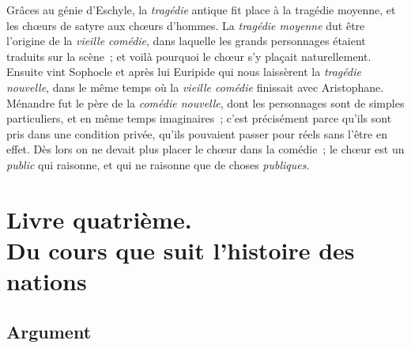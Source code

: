 \documentclass[french,twoside]{book} %
\newcommand\chapteropen{} %
\newcommand\chaptercont{} %
\newcommand\chapterclose{} %
\begin{document}
Grâces au génie d’Eschyle, la {\itshape tragédie} antique fit place à la tragédie moyenne, et les chœurs de satyre aux chœurs d’hommes. La {\itshape tragédie moyenne} dut être l’origine de la {\itshape vieille comédie}, dans laquelle les grands personnages étaient traduits sur la scène ; et voilà pourquoi le chœur s’y plaçait naturellement. Ensuite vint Sophocle et après lui Euripide qui nous laissèrent la {\itshape tragédie nouvelle}, dans le même temps où la {\itshape vieille comédie} finissait avec Aristophane. Ménandre fut le père de la {\itshape comédie nouvelle}, dont les personnages sont de simples particuliers, et en même temps imaginaires ; c’est précisément parce qu’ils sont pris dans une condition privée, qu’ils pouvaient passer pour réels sans l’être en effet. Dès lors on ne devait plus placer le chœur dans la comédie ; le chœur est un {\itshape public} qui raisonne, et qui ne raisonne que de choses {\itshape publiques}.
\chapterclose

\chapterclose


\chapteropen
\part[{Livre quatrième. Du cours que suit l’histoire des nations}]{Livre quatrième. \\
Du cours que suit l’histoire des nations}

\chaptercont

\chapteropen
\chapter[{Argument}]{Argument}
\end{document}
